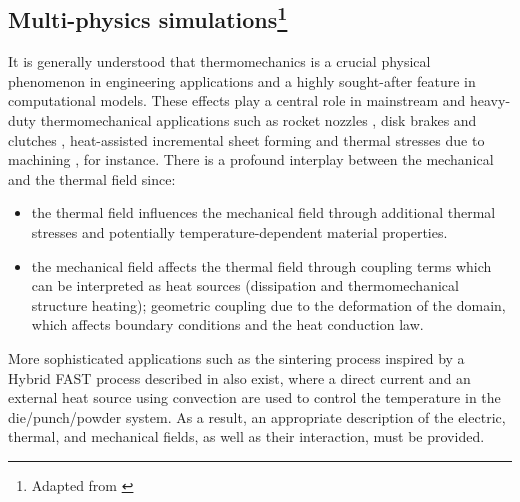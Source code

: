 \subsection{Multi-physics simulations\protect\footnote{Adapted from \cite{vila-chaNumericalAssessmentPartitioned2023a}}}\label{sec:multi_physics_sims}

It is generally understood that thermomechanics is a crucial physical phenomenon in engineering applications and a highly sought-after feature in computational models.
These effects play a central role in mainstream and heavy-duty thermomechanical applications such as rocket nozzles \citep{kuhl2002ThermomechanicalAnalysisOptimization,danowski_monolithic_2013}, disk brakes and clutches \citep{yevtushenko2015NumericalAnalysisThermal}, heat-assisted incremental sheet forming \citep{liu2018HeatassistedIncrementalSheet} and thermal stresses due to machining \citep{elsheikh2021ComprehensiveReviewResidual}, for instance.
There is a profound interplay between the mechanical and the thermal field since:
\begin{itemize}
  \item the thermal field influences the mechanical field through additional thermal stresses and potentially temperature-dependent material properties.
  \item  the mechanical field affects the thermal field through coupling terms which can be interpreted as heat sources (dissipation and thermomechanical structure heating); geometric coupling due to the deformation of the domain, which affects boundary conditions and the heat conduction law.
\end{itemize}

More sophisticated applications such as the sintering process inspired by a Hybrid FAST process described in \cite{rotheAnalyticalNumericalTreatment2014} also exist, where a direct current and an external heat source using convection are used to control the temperature in the die/punch/powder system.
As a result, an appropriate description of the electric, thermal, and mechanical fields, as well as their interaction, must be provided.

